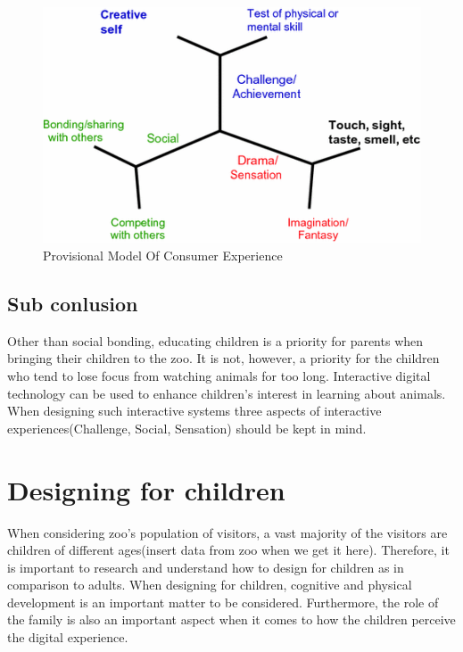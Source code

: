 \begin{figure}[H]
    	\centering
    	\includegraphics[width=0.9\linewidth]{figure/Analysis/provModelExp.png}
    	\caption{Provisional Model Of Consumer Experience\cite{Hull2018}}
    	\label{fig:provisionalModelOfConsumerExperience}
\end{figure}

\subsection{Sub conlusion}
Other than social bonding, educating children is a priority for parents when bringing their children to the zoo. It is not, however, a priority for the children who tend to lose focus from watching animals for too long\cite{togetherAtTheZoo}. Interactive digital technology can be used to enhance children's interest in learning about animals\cite{webberInteractiveTechInZoo}. When designing such interactive systems three aspects of interactive experiences(Challenge, Social, Sensation) should be kept in mind\cite{Hull2018}.

\section{Designing for children}
When considering zoo's population of visitors, a vast majority of the visitors are children of different ages(insert data from zoo when we get it here). Therefore, it is important to research and understand how to design for children as in comparison to adults. 
When designing for children, cognitive and physical development is an important matter to be considered\cite{kidsDesign}. Furthermore, the role of the family is also an important aspect when it comes to how the children perceive the digital experience\cite{kidsDesign}.

